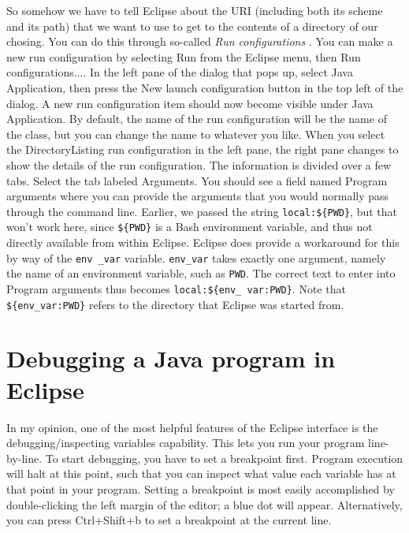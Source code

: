 \documentclass[12pt, a4paper, twoside, openany, titlepage]{book}
\begin{document}
So somehow we have to tell Eclipse about the URI (including both its scheme
and its path) that we want to use to get to the contents of a directory of
our chosing. You can do this through so-called \textit{Run configurations}
. You can make a new run configuration by
selecting \textsf{Run} from the Eclipse menu, then \textsf{Run
configurations...}. In the left pane of the dialog that pops up, select
\textsf{Java Application}, then press the \textsf{New launch configuration}
button in the top left of the dialog. A new run configuration item should
now become visible under \textsf{Java Application}. By default, the name of
the run configuration will be the name of the class, but you can change the
name to whatever you like. When you select the \textsf{DirectoryListing} run
configuration in the left pane, the right pane changes to show the details
of the run configuration. The information is divided over a few tabs. Select
the tab labeled \textsf{Arguments}. You should see a field named \textsf
{Program arguments} where you can provide the arguments that you would
normally pass through the command line. Earlier, we passed the string \texttt
{local:\$\{PWD\}}, but that won't work here, since \texttt{\$\{PWD\}} is a
Bash environment variable, and thus not directly available from within
Eclipse. Eclipse does provide a workaround for this by way of the \texttt{env
\_var} variable. \texttt{env\_var} takes exactly one argument, namely the
name of an environment variable, such as \texttt{PWD}. The correct text to
enter into \textsf{Program arguments} thus becomes \texttt{local:\$\{env\_
var:PWD\}}. Note that \texttt{\$\{env\_var:PWD\}} refers to the directory
that Eclipse was started from.





\section{Debugging a Java program in Eclipse}




In my opinion, one of the most helpful features of the Eclipse interface is
the debugging/inspecting variables capability. This lets you run your
program line-by-line. To start debugging, you have to set a breakpoint
first. Program execution will halt at this point, such that you can inspect
what value each variable has at that point in your program. Setting a
breakpoint is most easily accomplished by double-clicking the left margin of
the editor; a blue dot will appear. Alternatively, you can press \textsf
{Ctrl+Shift+b} to set a breakpoint at the current line.
\end{document}
